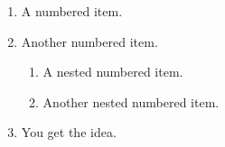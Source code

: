 \documentclass[12pt]{article}
\begin{document}
\begin{enumerate}
	\item  A  numbered  item.
	\item  Another  numbered  item.
		\begin{enumerate}
		\item  A  nested  numbered  item.
		\item  Another  nested  numbered  item.
		\end{enumerate}
	\item  You  get  the  idea.
\end{enumerate}
\end{document}
